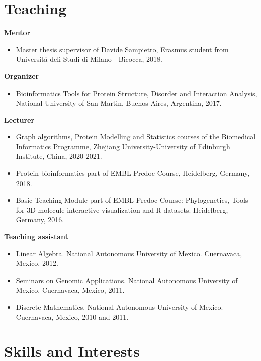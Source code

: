 \documentclass[11pt,a4paper,sans]{moderncv} %
\begin{document}
\section{Teaching}
\vspace{-.1cm}
\textbf{Mentor}
\begin{itemize}
  \item Master thesis supervisor of Davide Sampietro, Erasmus student from Universit\'a deli Studi di Milano - Bicocca, 2018.
\end{itemize}
\vspace{.1cm}
\textbf{Organizer}
\begin{itemize}
  \item Bioinformatics Tools for Protein Structure, Disorder and Interaction Analysis, National University of San Martin, Buenos Aires, Argentina, 2017.
\end{itemize}
\vspace{.1cm}
\textbf{Lecturer}
\begin{itemize}
  \item Graph algorithms, Protein Modelling and Statistics courses of the Biomedical Informatics Programme, Zhejiang University-University of Edinburgh Institute, China, 2020-2021.
  \item Protein bioinformatics part of EMBL Predoc Course, Heidelberg, Germany, 2018.
  \item Basic Teaching Module part of EMBL Predoc Course: Phylogenetics, Tools for 3D molecule interactive visualization and R datasets. Heidelberg, Germany, 2016.
\end{itemize}
\vspace{.1cm}
\textbf{Teaching assistant}
\begin{itemize}
  \item Linear Algebra. National Autonomous University of Mexico. Cuernavaca, Mexico, 2012.
  \item Seminars on Genomic Applications. National Autonomous University of Mexico. Cuernavaca, Mexico, 2011.
  \item Discrete Mathematics. National Autonomous University of Mexico. Cuernavaca, Mexico, 2010 and 2011.
\end{itemize}

\section{Skills and Interests}
\end{document}
